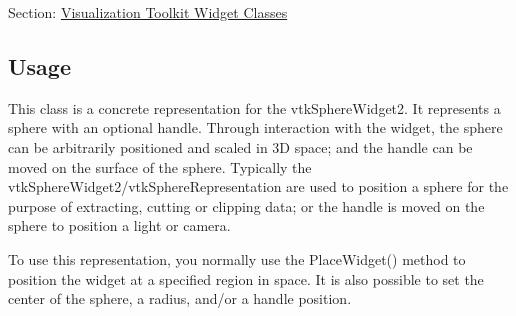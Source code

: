 Section\-: \hyperlink{sec_vtkwidgets}{Visualization Toolkit Widget Classes} \hypertarget{vtkwidgets_vtkxyplotwidget_Usage}{}\subsection{Usage}\label{vtkwidgets_vtkxyplotwidget_Usage}
This class is a concrete representation for the vtk\-Sphere\-Widget2. It represents a sphere with an optional handle. Through interaction with the widget, the sphere can be arbitrarily positioned and scaled in 3\-D space; and the handle can be moved on the surface of the sphere. Typically the vtk\-Sphere\-Widget2/vtk\-Sphere\-Representation are used to position a sphere for the purpose of extracting, cutting or clipping data; or the handle is moved on the sphere to position a light or camera.

To use this representation, you normally use the Place\-Widget() method to position the widget at a specified region in space. It is also possible to set the center of the sphere, a radius, and/or a handle position.

